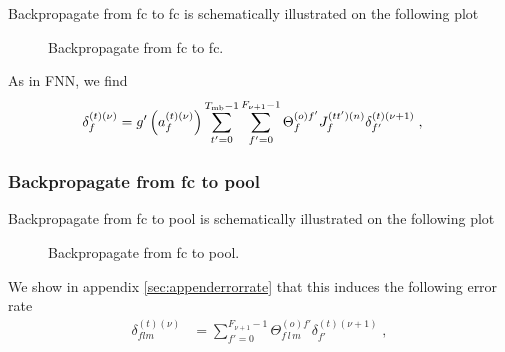 Backpropagate from fc to fc is schematically illustrated on the following plot

\begin{figure}[H]
\begin{center}
\caption{Backpropagate from fc to fc.}
\end{center}
\end{figure}
As in FNN, we find
\begin{align}
\delta^{(t)(\nu)}_f &=g'\left(a_{f}^{(t)(\nu)}\right)
%
\sum_{t'=0}^{T_{{\rm mb}}-1}\sum_{f'=0}^{F_{\nu+1}-1}\Theta^{(o)f'}_{f}J^{(tt')(n)}_{f} \delta^{(t)(\nu+1)}_{f'}\;,
\end{align}

\subsubsection{Backpropagate from fc to pool}

Backpropagate from fc to pool is schematically illustrated on the following plot

\begin{figure}[H]
\begin{center}
\caption{Backpropagate from fc to pool.}
\end{center}
\end{figure}
We show in appendix \ref{sec:appenderrorrate} that this induces the following error rate
\begin{align}
\delta^{(t)(\nu)}_{flm}&=\sum_{f'=0}^{F_{\nu+1}-1}\Theta^{(o)f'}_{f\,l\,m} \delta^{(t)(\nu+1)}_{f'}\;,
\end{align}

